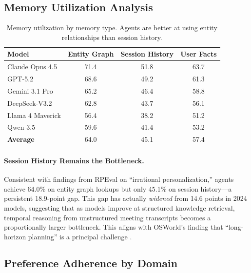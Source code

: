 \documentclass{article}
\begin{document}
\subsection{Memory Utilization Analysis}

\begin{table}[h]
\centering
\caption{Memory utilization by memory type. Agents are better at using entity relationships than session history.}
\label{tab:memory-type}
\begin{tabular}{lccc}
\toprule
\textbf{Model} & \textbf{Entity Graph} & \textbf{Session History} & \textbf{User Facts} \\
\midrule
Claude Opus 4.5 & 71.4 & 51.8 & 63.7 \\
GPT-5.2 & 68.6 & 49.2 & 61.3 \\
Gemini 3.1 Pro & 65.2 & 46.4 & 58.8 \\
DeepSeek-V3.2 & 62.8 & 43.7 & 56.1 \\
Llama 4 Maverick & 56.4 & 38.2 & 51.2 \\
Qwen 3.5 & 59.6 & 41.4 & 53.2 \\
\midrule
\textbf{Average} & 64.0 & 45.1 & 57.4 \\
\bottomrule
\end{tabular}
\end{table}

\paragraph{Session History Remains the Bottleneck.} Consistent with findings from RPEval \citep{rpeval2026} on ``irrational personalization,'' agents achieve 64.0\% on entity graph lookups but only 45.1\% on session history---a persistent 18.9-point gap. This gap has actually \emph{widened} from 14.6 points in 2024 models, suggesting that as models improve at structured knowledge retrieval, temporal reasoning from unstructured meeting transcripts becomes a proportionally larger bottleneck. This aligns with OSWorld's finding that ``long-horizon planning'' is a principal challenge \citep{osworld2024}.

\subsection{Preference Adherence by Domain}
\end{document}
